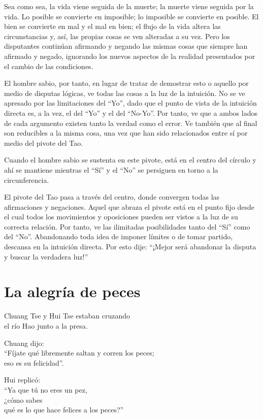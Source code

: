 \documentclass[hidelinks]{memoir}
\begin{document}
	Sea como sea, la vida viene seguida de la muerte; la muerte viene
	seguida por la vida. Lo posible se convierte en imposible; lo imposible
	se convierte en posible. El bien se convierte en mal y el mal en bien;
	el flujo de la vida altera las circunstancias y, así, las propias cosas
	se ven alteradas a su vez. Pero los disputantes continúan afirmando y
	negando las mismas cosas que siempre han afirmado y negado, ignorando
	los nuevos aspectos de la realidad presentados por el cambio de las
	condiciones.
	
	El hombre sabio, por tanto, en lugar de tratar de demostrar esto o
	aquello por medio de disputas lógicas, ve todas las cosas a la luz de la
	intuición. No se ve apresado por las limitaciones del ``Yo'', dado que
	el punto de vista de la intuición directa es, a la vez, el del ``Yo'' y
	el del ``No-Yo''. Por tanto, ve que a ambos lados de cada argumento
	existen tanto la verdad como el error. Ve también que al final son
	reducibles a la misma cosa, una vez que han sido relacionados entre sí
	por medio del pivote del Tao.
	
	Cuando el hombre sabio se sustenta en este pivote, está en el centro del
	círculo y ahí se mantiene mientras el ``Sí'' y el ``No'' se persiguen en
	torno a la circunferencia.
	
	El pivote del Tao pasa a través del centro, donde convergen todas las
	afirmaciones y negaciones. Aquel que abraza el pivote está en el punto
	fijo desde el cual todos los movimientos y oposiciones pueden ser vistos
	a la luz de su correcta relación. Por tanto, ve las ilimitadas
	posibilidades tanto del ``Sí'' como del ``No''. Abandonando toda idea de
	imponer límites o de tomar partido, descansa en la intuición directa.
	Por esto dije: ``¡Mejor será abandonar la disputa y buscar la verdadera
	luz!''
	
	\chapter*{La alegría de peces}
	
	Chuang Tse y Hui Tse estaban cruzando\\
	el río Hao junto a la presa.
	
	Chuang dijo:\\
	``Fíjate qué libremente saltan y corren los peces;\\
	eso es su felicidad''.
	
	Hui replicó:\\
	``Ya que tú no eres un pez,\\
	¿cómo sabes\\
	qué es lo que hace felices a los peces?''
	
\end{document}
